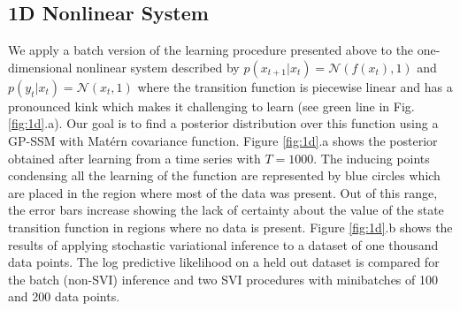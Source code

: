 \documentclass{article} %
\newcommand{\x}{\mathbf{x}}
\begin{document}
\subsection{1D Nonlinear System}

We apply a batch version of the learning procedure presented above to the one-dimensional nonlinear system described by $p(x_{t+1} | x_t) = \mathcal{N}(f(x_t), 1)$ and $p(y_t | x_t) = \mathcal{N}(x_t, 1)$ where the transition function is piecewise linear and has a pronounced kink which makes it challenging to learn (see green line in Fig. \ref{fig:1d}.a). Our goal is to find a posterior distribution over this function using a GP-SSM with Mat\'{e}rn covariance function. Figure \ref{fig:1d}.a shows the posterior obtained after learning from a time series with $T=1000$. The inducing points condensing all the learning of the function are represented by blue circles which are placed in the region where most of the data was present. Out of this range, the error bars increase showing the lack of certainty about the value of the state transition function in regions where no data is present. Figure \ref{fig:1d}.b shows the results of applying stochastic variational inference to a dataset of one thousand data points. The log predictive likelihood on a held out dataset is compared for the batch (non-SVI) inference and two SVI procedures with minibatches of 100 and 200 data points.




\end{document}
